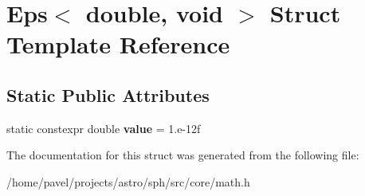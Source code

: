 \hypertarget{structEps_3_01double_00_01void_01_4}{}\section{Eps$<$ double, void $>$ Struct Template Reference}
\label{structEps_3_01double_00_01void_01_4}
\subsection*{Static Public Attributes}
\begin{DoxyCompactItemize}
\item 
\hypertarget{structEps_3_01double_00_01void_01_4_a65918dd6b953bff246c685bc4a9cdb41}{}\label{structEps_3_01double_00_01void_01_4_a65918dd6b953bff246c685bc4a9cdb41} 
static constexpr double {\bfseries value} = 1.e-\/12f
\end{DoxyCompactItemize}


The documentation for this struct was generated from the following file\+:\begin{DoxyCompactItemize}
\item 
/home/pavel/projects/astro/sph/src/core/math.\+h\end{DoxyCompactItemize}
